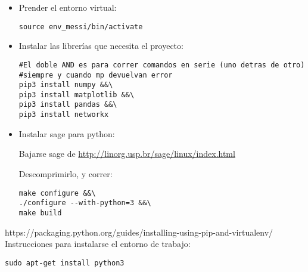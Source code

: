 \documentclass[10pt,a4paper]{report}
\begin{document}
\begin{itemize}
\item Prender el entorno virtual:

\begin{lstlisting}
source env_messi/bin/activate
\end{lstlisting}

\item Instalar las librerías que necesita el proyecto:

\begin{lstlisting}
#El doble AND es para correr comandos en serie (uno detras de otro)
#siempre y cuando mp devuelvan error
pip3 install numpy &&\
pip3 install matplotlib &&\
pip3 install pandas &&\
pip3 install networkx
\end{lstlisting}


\item Instalar sage para python:

Bajarse sage de \url{http://linorg.usp.br/sage/linux/index.html}

Descomprimirlo, y correr:

\begin{lstlisting}
make configure &&\
./configure --with-python=3 &&\
make build
\end{lstlisting}

\end{itemize}



https://packaging.python.org/guides/installing-using-pip-and-virtualenv/
Instrucciones para instalarse el entorno de trabajo:


\begin{lstlisting}
sudo apt-get install python3
\end{lstlisting}
\end{document}
